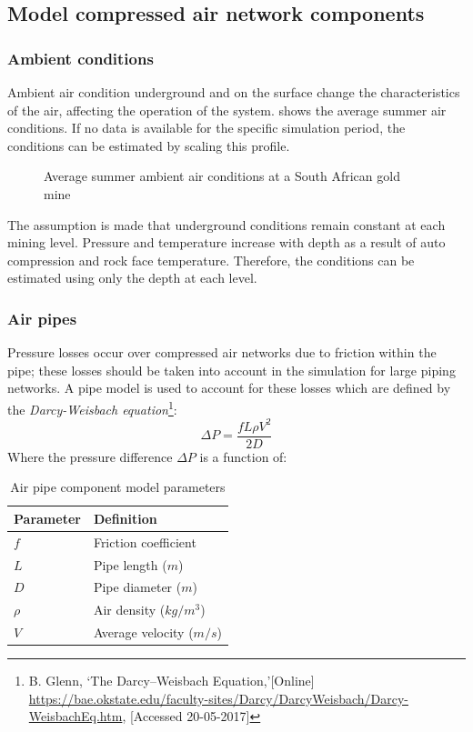 	\subsection{Model compressed air network components}
		\subsubsection{Ambient conditions}
		Ambient air condition underground and on the surface change the characteristics of the air, affecting the operation of the system.  shows the average summer air conditions. If no data is available for the specific simulation period, the conditions can be estimated by scaling this profile.
		\begin{figure}[h!]
			\centering
			\fbox{}
			\caption{Average summer ambient air conditions at a South African gold mine}
			\label{fig: Ambient}
		\end{figure}
		\par
		The assumption is made that underground conditions remain constant at each mining level. Pressure and temperature increase with depth as a result of auto compression and rock face temperature. Therefore, the conditions can be estimated using only the depth at each level.
		\subsubsection{Air pipes}
		Pressure losses occur over compressed air networks due to friction within the pipe; these losses should be taken into account in the simulation for large piping networks. A pipe model is used to account for these losses which are defined by the \textit{Darcy-Weisbach equation}\footnote{ B. Glenn, \enquote*{The Darcy–Weisbach Equation,}[Online] \url{https://bae.okstate.edu/faculty-sites/Darcy/DarcyWeisbach/Darcy-WeisbachEq.htm}, [Accessed 20-05-2017]}:
		$$\Delta P = \frac{f L \rho V^2}{2 D}$$
		Where the pressure difference $\Delta P $ is a function of:
		\begin{table}[h!]
			\centering
			\begin{tabular}{ll}
				\hline
				Parameter & Definition\\
				\hline
				$f$ & Friction coefficient \\
				$L$ & Pipe length ($m$) \\
				$D$ & Pipe diameter ($m$) \\
				$\rho$ & Air density ($kg/m^3$)\\	
				$V$ & Average velocity ($m/s$) \\	
				\hline
			\end{tabular} 
			\caption{Air pipe component model parameters}
			\label{table: Darcy-Weisbach}
		\end{table}
		
